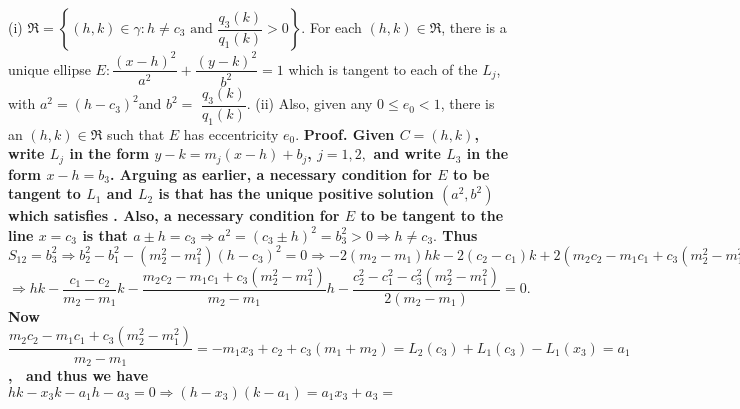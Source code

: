 (i) $\Re =\left\{ (h,k)\in \gamma :h\neq c_{3}\text{ and }\dfrac{q_{3}(k)}{q_{1}(k)}>0\right\}$. For each $(h,k)\in \Re $, there is a unique ellipse $E:\dfrac{(x-h)^{2}}{a^{2}}+\dfrac{(y-k)^{2}}{b^{2}}=1$ which is tangent to each of the $L_{j}$, with $a^{2}=(h-c_{3})^{2}$and $b^{2}=$ $\dfrac{q_{3}(k)}{q_{1}(k)}.$ \nl 
(ii) Also, given any $0\leq e_{0}<1$, there is an $(h,k)\in \Re $ such that $E$ has eccentricity $e_{0}$. \nl 
\bf Proof. \rm Given $C=(h,k)$, write $L_{j}$ in the form $y-k=m_{j}(x-h)+b_{j}$, $j=1,2,$ and write $L_{3}$ in the form $x-h=b_{3}$. Arguing as earlier, a necessary condition for $E$ to be tangent to $L_{1}$ and $L_{2}$ is that  has the unique positive solution $(a^{2},b^{2})$ which satisfies . Also, a necessary condition for $E$ to be tangent to the line $x=c_{3}$ is that $a\pm h=c_{3}\Rightarrow a^{2}=(c_{3}\pm h)^{2}=b_{3}^{2}>0\Rightarrow h\neq c_{3}.$ Thus $S_{12}=b_{3}^{2}\Rightarrow b_{2}^{2}-b_{1}^{2}-(m_{2}^{2}-m_{1}^{2})(h-c_{3})^{2}=0\Rightarrow -2(m_{2}-m_{1})hk-2(c_{2}-c_{1})k+2(m_{2}c_{2}-m_{1}c_{1}+c_{3}(m_{2}^{2}-m_{1}^{2}))h+c_{2}^{2}-c_{1}^{2}-c_{3}^{2}(m_{2}^{2}-m_{1}^{2})=0$ $\Rightarrow hk-\dfrac{c_{1}-c_{2}}{m_{2}-m_{1}}k-\dfrac{m_{2}c_{2}-m_{1}c_{1}+c_{3}(m_{2}^{2}-m_{1}^{2})}{m_{2}-m_{1}}h-\dfrac{c_{2}^{2}-c_{1}^{2}-c_{3}^{2}(m_{2}^{2}-m_{1}^{2})}{2(m_{2}-m_{1})}=0.$ Now 	
$\dfrac{m_{2}c_{2}-m_{1}c_{1}+c_{3}(m_{2}^{2}-m_{1}^{2})}{m_{2}-m_{1}}=-m_{1}x_{3}+c_{2}+c_{3}(m_{1}+m_{2})=L_{2}(c_{3})+L_{1}(c_{3})-L_{1}(x_{3})=a_{1}$, \ and thus we have $hk-x_{3}k-a_{1}h-a_{3}=0\Rightarrow (h-x_{3})(k-a_{1})=a_{1}x_{3}+a_{3}=$ 	
